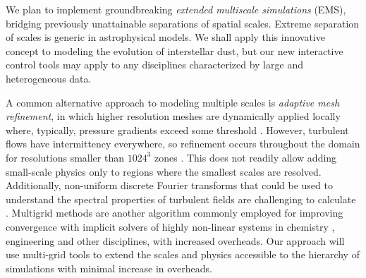 \documentclass[a4paper,12pt]{article}
\newcommand{\instructions}[1]{\textcolor{blue}{#1}}
\begin{document}

We plan to implement groundbreaking {\textit{extended multiscale simulations}}
(EMS), bridging previously unattainable separations of spatial scales.  Extreme
separation of scales is generic in astrophysical models.  We shall apply this
innovative concept to modeling the evolution of interstellar dust, but our new
interactive control tools may apply to any disciplines characterized by large
and heterogeneous data.

A common alternative approach to modeling multiple scales is \textit{adaptive
mesh refinement}, in which higher resolution meshes are dynamically applied
locally where, typically, pressure gradients exceed some threshold
\citep{Berger89}.  However, turbulent flows have intermittency everywhere, so
refinement occurs throughout the domain for resolutions smaller than $1024^3$
zones \citep{Kritsuk06}.  This does not readily allow adding small-scale
physics only to regions where the smallest scales are resolved.  Additionally,
non-uniform discrete Fourier transforms that could be used to understand the
spectral properties of turbulent fields are challenging to calculate
\citep{NUFFT}. Multigrid methods are another algorithm commonly employed for
improving convergence with implicit solvers of highly non-linear systems in
chemistry \citep{MGRID}, engineering and other disciplines, with increased
overheads. Our approach will use multi-grid tools to extend the scales and
physics accessible to the hierarchy of simulations with minimal increase in
overheads.
\end{document}
